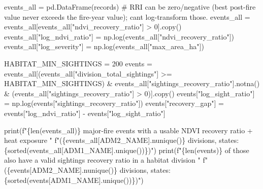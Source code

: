 \documentclass[
  letterpaper,
  DIV=11,
  numbers=noendperiod]{scrartcl}
\newenvironment{Shaded}{\begin{snugshade}}{\end{snugshade}}
\newcommand{\BuiltInTok}[1]{\textcolor[rgb]{0.00,0.23,0.31}{#1}}
\newcommand{\CommentTok}[1]{\textcolor[rgb]{0.37,0.37,0.37}{#1}}
\newcommand{\DecValTok}[1]{\textcolor[rgb]{0.68,0.00,0.00}{#1}}
\newcommand{\NormalTok}[1]{\textcolor[rgb]{0.00,0.23,0.31}{#1}}
\newcommand{\OperatorTok}[1]{\textcolor[rgb]{0.37,0.37,0.37}{#1}}
\newcommand{\SpecialCharTok}[1]{\textcolor[rgb]{0.37,0.37,0.37}{#1}}
\newcommand{\SpecialStringTok}[1]{\textcolor[rgb]{0.13,0.47,0.30}{#1}}
\newcommand{\StringTok}[1]{\textcolor[rgb]{0.13,0.47,0.30}{#1}}
\begin{document}
\begin{Shaded}
\begin{Highlighting}[]
\NormalTok{events\_all }\OperatorTok{=}\NormalTok{ pd.DataFrame(records)}
\CommentTok{\# RRI can be zero/negative (best post{-}fire value never exceeds the fire{-}year value); can\textquotesingle{}t log{-}transform those.}
\NormalTok{events\_all }\OperatorTok{=}\NormalTok{ events\_all[events\_all[}\StringTok{"ndvi\_recovery\_ratio"}\NormalTok{] }\OperatorTok{\textgreater{}} \DecValTok{0}\NormalTok{].copy()}
\NormalTok{events\_all[}\StringTok{"log\_ndvi\_ratio"}\NormalTok{] }\OperatorTok{=}\NormalTok{ np.log(events\_all[}\StringTok{"ndvi\_recovery\_ratio"}\NormalTok{])}
\NormalTok{events\_all[}\StringTok{"log\_severity"}\NormalTok{] }\OperatorTok{=}\NormalTok{ np.log(events\_all[}\StringTok{"max\_area\_ha"}\NormalTok{])}

\NormalTok{HABITAT\_MIN\_SIGHTINGS }\OperatorTok{=} \DecValTok{200}
\NormalTok{events }\OperatorTok{=}\NormalTok{ events\_all[(events\_all[}\StringTok{"division\_total\_sightings"}\NormalTok{] }\OperatorTok{\textgreater{}=}\NormalTok{ HABITAT\_MIN\_SIGHTINGS)}
                     \OperatorTok{\&}\NormalTok{ events\_all[}\StringTok{"sightings\_recovery\_ratio"}\NormalTok{].notna()}
                     \OperatorTok{\&}\NormalTok{ (events\_all[}\StringTok{"sightings\_recovery\_ratio"}\NormalTok{] }\OperatorTok{\textgreater{}} \DecValTok{0}\NormalTok{)].copy()}
\NormalTok{events[}\StringTok{"log\_sight\_ratio"}\NormalTok{] }\OperatorTok{=}\NormalTok{ np.log(events[}\StringTok{"sightings\_recovery\_ratio"}\NormalTok{])}
\NormalTok{events[}\StringTok{"recovery\_gap"}\NormalTok{] }\OperatorTok{=}\NormalTok{ events[}\StringTok{"log\_ndvi\_ratio"}\NormalTok{] }\OperatorTok{{-}}\NormalTok{ events[}\StringTok{"log\_sight\_ratio"}\NormalTok{]}

\BuiltInTok{print}\NormalTok{(}\SpecialStringTok{f"}\SpecialCharTok{\{}\BuiltInTok{len}\NormalTok{(events\_all)}\SpecialCharTok{\}}\SpecialStringTok{ major{-}fire events with a usable NDVI recovery ratio + heat exposure "}
      \SpecialStringTok{f"(}\SpecialCharTok{\{}\NormalTok{events\_all[}\StringTok{\textquotesingle{}ADM2\_NAME\textquotesingle{}}\NormalTok{]}\SpecialCharTok{.}\NormalTok{nunique()}\SpecialCharTok{\}}\SpecialStringTok{ divisions, states: }\SpecialCharTok{\{}\BuiltInTok{sorted}\NormalTok{(events\_all[}\StringTok{\textquotesingle{}ADM1\_NAME\textquotesingle{}}\NormalTok{].unique())}\SpecialCharTok{\}}\SpecialStringTok{)"}\NormalTok{)}
\BuiltInTok{print}\NormalTok{(}\SpecialStringTok{f"}\SpecialCharTok{\{}\BuiltInTok{len}\NormalTok{(events)}\SpecialCharTok{\}}\SpecialStringTok{ of those also have a valid sightings recovery ratio in a habitat division "}
      \SpecialStringTok{f"(}\SpecialCharTok{\{}\NormalTok{events[}\StringTok{\textquotesingle{}ADM2\_NAME\textquotesingle{}}\NormalTok{]}\SpecialCharTok{.}\NormalTok{nunique()}\SpecialCharTok{\}}\SpecialStringTok{ divisions, states: }\SpecialCharTok{\{}\BuiltInTok{sorted}\NormalTok{(events[}\StringTok{\textquotesingle{}ADM1\_NAME\textquotesingle{}}\NormalTok{].unique())}\SpecialCharTok{\}}\SpecialStringTok{)"}\NormalTok{)}
\end{Highlighting}
\end{Shaded}
\end{document}
